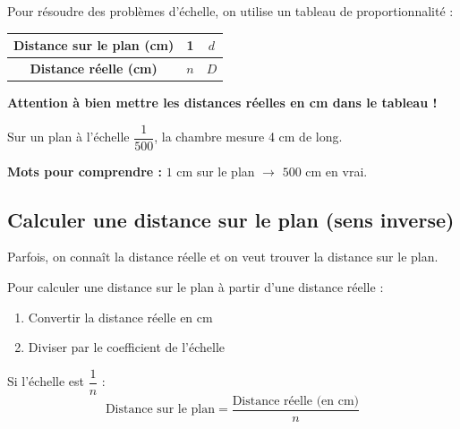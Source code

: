 \begin{methodebox}
	Pour résoudre des problèmes d'échelle, on utilise un tableau de proportionnalité :
	\begin{center}
		\renewcommand{\arraystretch}{1.5}
		\begin{tabular}{|c|c|c|}
			\hline
			\textbf{Distance sur le plan (cm)} & 1 & $d$ \\
			\hline
			\textbf{Distance réelle (cm)} & $n$ & $D$ \\
			\hline
		\end{tabular}
	\end{center}
	\textbf{Attention à bien mettre les distances réelles en cm dans le tableau !}
\end{methodebox}

\begin{exercisebox}
	Sur un plan à l'échelle $\dfrac{1}{500}$, la chambre mesure 4 cm de long.

	\textbf{Mots pour comprendre :} $1$ cm sur le plan $\rightarrow$ $500$ cm en vrai.

\end{exercisebox}

\subsection{Calculer une distance sur le plan (sens inverse)}

Parfois, on connaît la distance réelle et on veut trouver la distance sur le plan.

\begin{methodebox}
	Pour calculer une distance sur le plan à partir d'une distance réelle :
	\begin{enumerate}
		\item Convertir la distance réelle en cm
		\item Diviser par le coefficient de l'échelle
	\end{enumerate}

	Si l'échelle est $\dfrac{1}{n}$ :
	$$\text{Distance sur le plan} = \dfrac{\text{Distance réelle (en cm)}}{n}$$
\end{methodebox}

